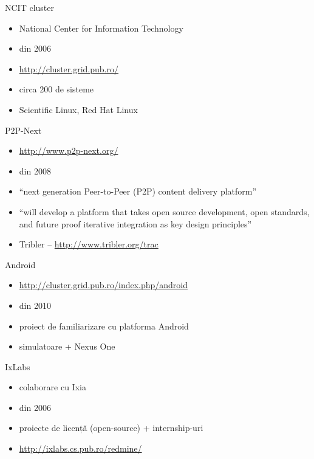 \documentclass{simple}
\begin{document}
\begin{frame}{NCIT cluster}
	\begin{itemize}
		\item National Center for Information Technology
		\item din 2006
		\item \url{http://cluster.grid.pub.ro/}
		\item circa 200 de sisteme
		\item Scientific Linux, Red Hat Linux
	\end{itemize}
\end{frame}

\begin{frame}{P2P-Next}
	\begin{itemize}
		\item \url{http://www.p2p-next.org/}
		\item din 2008
		\item ``next generation Peer-to-Peer (P2P) content delivery platform''
		\item ``will develop a platform that takes open source development,
		open standards, and future proof iterative integration as key design
		principles''
		\item Tribler -- \url{http://www.tribler.org/trac}
	\end{itemize}
\end{frame}

\begin{frame}{Android}
	\begin{itemize}
		\item \url{http://cluster.grid.pub.ro/index.php/android}
		\item din 2010
		\item proiect de familiarizare cu platforma Android
		\item simulatoare + Nexus One
	\end{itemize}
\end{frame}

\begin{frame}{IxLabs}
	\begin{itemize}
		\item colaborare cu Ixia
		\item din 2006
		\item proiecte de licență (open-source) + internship-uri
		\item \url{http://ixlabs.cs.pub.ro/redmine/}
	\end{itemize}
\end{frame}
\end{document}
